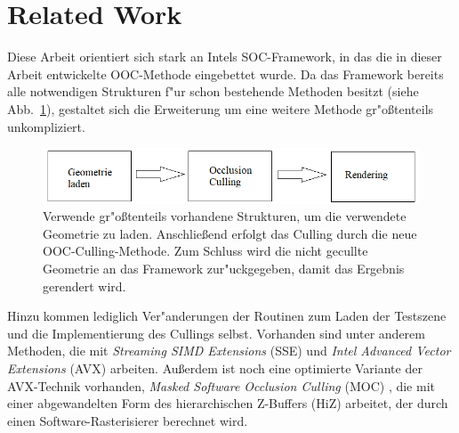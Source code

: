 \documentclass[journal]{vgtc}
\begin{document}
\section{Related Work}
Diese Arbeit orientiert sich stark an Intels SOC-Framework, in das die in dieser Arbeit entwickelte OOC-Methode eingebettet wurde.
Da das Framework bereits alle notwendigen Strukturen f"ur schon bestehende Methoden besitzt (siehe Abb.\ \ref{fig:ablaufframework}), gestaltet sich die Erweiterung um eine weitere Methode gr"o{\ss}tenteils unkompliziert. 
\begin{figure}%
\includegraphics[width=\columnwidth]{images/AblaufFramework.png}%
\caption{Verwende gr"o{\ss}tenteils vorhandene Strukturen, um die verwendete Geometrie zu laden. Anschlie{\ss}end erfolgt das Culling durch die neue OOC-Culling-Methode. Zum Schluss wird die nicht gecullte Geometrie an das Framework zur"uckgegeben, damit das Ergebnis gerendert wird.}%
\label{fig:ablaufframework}%
\end{figure}
Hinzu kommen lediglich Ver"anderungen der Routinen zum Laden der Testszene und die Implementierung des Cullings selbst.
Vorhanden sind unter anderem Methoden, die mit \textit{Streaming SIMD Extensions} (SSE) und \textit{Intel Advanced Vector Extensions} (AVX) arbeiten.
Au{\ss}erdem ist noch eine optimierte Variante der AVX-Technik vorhanden, \textit{Masked Software Occlusion Culling} (MOC) \cite{MSOC}, die mit einer abgewandelten Form des hierarchischen Z-Buffers (HiZ) \cite{HiZ} arbeitet, der durch einen Software-Rasterisierer berechnet wird.
\end{document}
